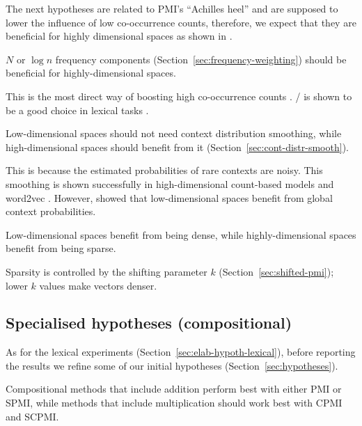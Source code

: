 The next hypotheses are related to PMI's ``Achilles heel'' and are supposed to lower the influence of low co-occurrence counts, therefore, we expect that they are beneficial for highly dimensional spaces as shown in .

\begin{hyp}
  \label{hyp:freq}
 $N$ or $\log n$ frequency components (Section~\ref{sec:frequency-weighting}) should be beneficial for highly-dimensional spaces.
\end{hyp}

This is the most direct way of boosting high co-occurrence counts \cite{Evert05}. \NPMI/ is shown to be a good choice in lexical tasks \cite{Bruni:2012:DST:2390524.2390544}.

\begin{hyp}
  \label{hyp:cds}
  Low-dimensional spaces should not need context distribution smoothing, while high-dimensional spaces should benefit from it (Section~\ref{sec:cont-distr-smooth}).
\end{hyp}

This is because the estimated probabilities of rare contexts are noisy. This smoothing is shown successfully in high-dimensional count-based models \cite{TACL570} and word2vec \cite{mikolov2013efficient}. However,  showed that low-dimensional spaces benefit from global context probabilities.

\begin{hyp}
  \label{hyp:neg}
  Low-dimensional spaces benefit from being dense, while highly-dimensional spaces benefit from being sparse.
\end{hyp}

Sparsity is controlled by the shifting parameter $k$ (Section~\ref{sec:shifted-pmi}); lower $k$ values make vectors denser.

\subsection{Specialised hypotheses (compositional)}
\label{sec:elab-hypoth-comp}

 As for the lexical experiments (Section~\ref{sec:elab-hypoth-lexical}), before reporting the results we refine some of our initial hypotheses (Section~\ref{sec:hypotheses}).

\begin{hyp}
  \label{hyp:comp-pmi-cpmi}
  Compositional methods that include addition perform best with either PMI or SPMI, while methods that include multiplication should work best with CPMI and SCPMI.
\end{hyp}

